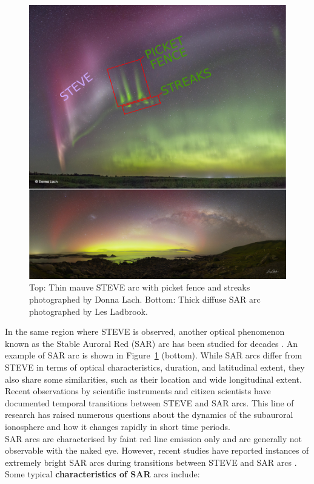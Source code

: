 \documentclass{article}
\renewcommand{\cite}[1]{\parencite{#1}}
\begin{document}
\begin{figure}[h!]
  \includegraphics[width=\linewidth]{Fig7_stevesararc.png}
  \caption{Top: Thin mauve STEVE arc with picket fence and streaks photographed by Donna Lach. Bottom: Thick diffuse SAR arc photographed by Les Ladbrook.}
  \label{fig-stevesararc}
\end{figure}
In the same region where STEVE is observed, another optical phenomenon known as the Stable Auroral Red (SAR) arc has been studied for decades \cite{Kozyra1997, Mendillo_2016a, Martinis2022}. An example of SAR arc is shown in Figure~\ref{fig-stevesararc} (bottom). While SAR arcs differ from STEVE in terms of optical characteristics, duration, and latitudinal extent, they also share some similarities, such as their location and wide longitudinal extent. Recent observations by scientific instruments and citizen scientists have documented temporal transitions between STEVE and SAR arcs. This line of research has raised numerous questions about the dynamics of the subauroral ionosphere and how it changes rapidly in short time periods.\\

SAR arcs are characterised by faint red line emission only and are generally not observable with the naked eye. However, recent studies have reported instances of extremely bright SAR arcs during transitions between STEVE and SAR arcs \cite{Martinis2022}. Some typical {\bf characteristics of SAR} arcs include:
\end{document}
